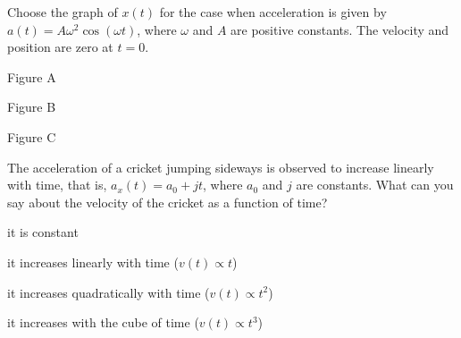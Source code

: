 \begin{checkpoint}
\begin{MCquestion}{Choose the graph of $x(t)$ for the case when acceleration is given by $a(t)=A\omega^2\cos(\omega t)$, where $\omega$ and $A$ are positive constants. The velocity and position are zero at $t=0$.
}
\item Figure A \correct
\item Figure B
\item Figure C 
\end{MCquestion}
\end{checkpoint}

\begin{checkpoint}
\begin{MCquestion}{The acceleration of a cricket jumping sideways is observed to increase linearly with time, that is, $a_x(t)=a_0+jt$, where $a_0$ and $j$ are constants. What can you say about the velocity of the cricket as a function of time?}
\item it is constant
\item it increases linearly with time ($v(t)\propto t$)
\item it increases quadratically with time ($v(t)\propto t^2$) \correct
\item it increases with the cube of time ($v(t)\propto t^3$)
\end{MCquestion}
\end{checkpoint}

